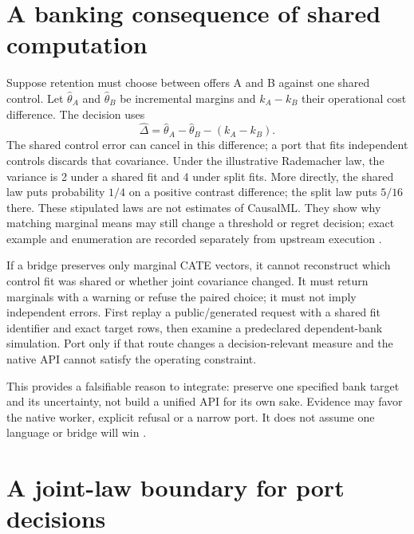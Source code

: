 \section{A banking consequence of shared computation}

Suppose retention must choose between offers A and B against one shared
control. Let $\widehat\theta_A$ and $\widehat\theta_B$ be incremental margins
and $k_A-k_B$ their operational cost difference. The decision uses
\[
  \widehat\Delta=\widehat\theta_A-\widehat\theta_B-(k_A-k_B).
\]
The shared control error can cancel in this difference; a port that fits
independent controls discards that covariance. Under the illustrative
Rademacher law, the variance is 2 under a shared fit and 4 under split fits.
More directly, the shared law puts probability $1/4$ on a positive contrast
difference; the split law puts $5/16$ there. These stipulated laws are not
estimates of CausalML. They show why matching marginal means may still change
a threshold or regret decision; exact example and enumeration are recorded
separately from upstream execution \citep{exec17_s9_bank_oracle}.

If a bridge preserves only marginal CATE vectors, it cannot reconstruct which
control fit was shared or whether joint covariance changed. It must return
marginals with a warning or refuse the paired choice; it must not imply
independent errors. First replay a public/generated request with a shared fit
identifier and exact target rows, then examine a predeclared dependent-bank
simulation. Port only if that route changes a decision-relevant measure and the
native API cannot satisfy the operating constraint.

This provides a falsifiable reason to integrate: preserve one specified bank
target and its uncertainty, not build a unified API for its own sake. Evidence
may favor the native worker, explicit refusal or a narrow port. It does not
assume one language or bridge will win \citep{exec17_s9_admission}.

\section{A joint-law boundary for port decisions}
\label{exec17:s9-law-boundary}

